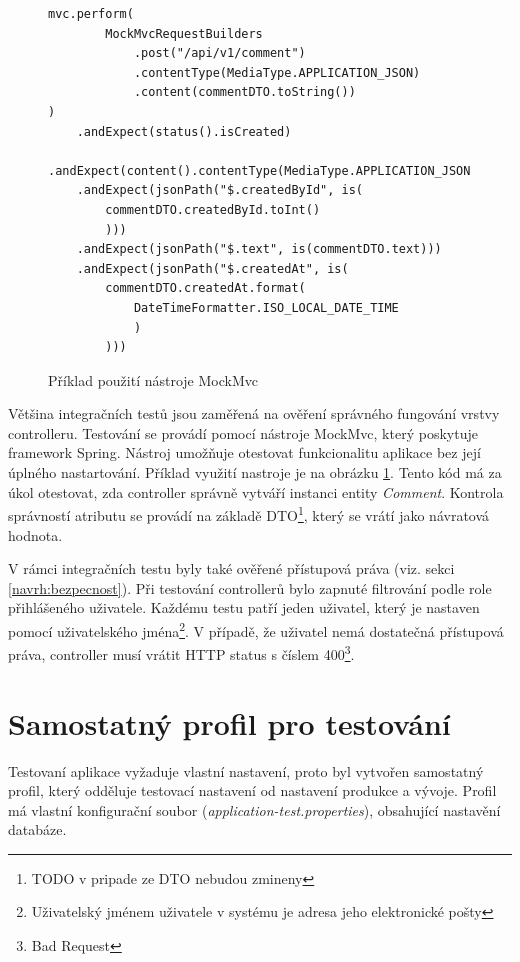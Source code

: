         \begin{figure}
        \begin{verbatim}
mvc.perform(
        MockMvcRequestBuilders
            .post("/api/v1/comment")
            .contentType(MediaType.APPLICATION_JSON)
            .content(commentDTO.toString())
)
    .andExpect(status().isCreated)
    .andExpect(content().contentType(MediaType.APPLICATION_JSON))
    .andExpect(jsonPath("$.createdById", is(
        commentDTO.createdById.toInt()
        )))
    .andExpect(jsonPath("$.text", is(commentDTO.text)))
    .andExpect(jsonPath("$.createdAt", is(
        commentDTO.createdAt.format(
            DateTimeFormatter.ISO_LOCAL_DATE_TIME
            )
        )))

        \end{verbatim}
        \caption{Příklad použití nástroje MockMvc} 
        \label{code:mockmvc}
    \end{figure}
    Většina integračních testů jsou zaměřená na ověření správného fungování vrstvy controlleru. Testování se provádí pomocí nástroje MockMvc\cite{mock-mvc}, který poskytuje framework Spring. Nástroj umožňuje otestovat funkcionalitu aplikace bez její úplného nastartování. Příklad využití nastroje je na obrázku \ref{code:mockmvc}. Tento kód má za úkol otestovat, zda controller správně vytváří instanci entity \textit{Comment}. Kontrola správností atributu se provádí na základě DTO\footnote{TODO v pripade ze DTO nebudou zmineny}, který se vrátí jako návratová hodnota.
    
    V rámci integračních testu byly také ověřené přístupová práva (viz. sekci \ref{navrh:bezpecnost}). Při testování controllerů bylo zapnuté filtrování podle role přihlášeného uživatele. Každému testu patří jeden uživatel, který je nastaven pomocí uživatelského jména\footnote{Uživatelský jménem uživatele v systému je adresa jeho elektronické pošty}. V případě, že uživatel nemá dostatečná přístupová práva, controller musí vrátit HTTP status s číslem 400\footnote{Bad Request}.
    
\section{Samostatný profil pro testování}

    Testovaní aplikace vyžaduje vlastní nastavení, proto byl vytvořen samostatný profil, který odděluje testovací nastavení od nastavení produkce a vývoje. Profil má vlastní konfigurační soubor (\textit{application-test.properties}), obsahující nastavění databáze.
    

